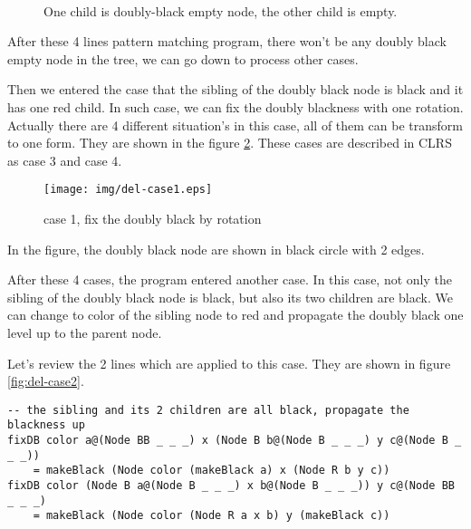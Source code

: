 \documentclass{article}
\begin{document}
\begin{figure}[htbp]
   \centering
    \\
   \caption{One child is doubly-black empty node, the other child is empty.} \label{fig:db-fix-1-nil}
\end{figure}


After these 4 lines pattern matching program, there won't be any doubly black empty
node in the tree, we can go down to process other cases.

Then we entered the case that the sibling of the doubly black node is black and it
has one red child. In such case, we can fix the doubly blackness with one rotation.
Actually there are 4 different situation's in this case, all of them can be transform
to one form. They are shown in the figure \ref{fig:del-case1}. These cases are described
in CLRS as case 3 and case 4.

\begin{figure}[htbp]
       \begin{center}
	\texttt{[image: img/del-case1.eps]}
        \caption{case 1, fix the doubly black by rotation} \label{fig:del-case1}
       \end{center}
\end{figure}

In the figure, the doubly black node are shown in black circle with 2 edges.

After these 4 cases, the program entered another case. In this case, not only the sibling
of the doubly black node is black, but also its two children are black. We can change to color
of the sibling node to red and propagate the doubly black one level up to the parent node.

Let's review the 2 lines which are applied to this case. They are shown in figure \ref{fig:del-case2}.

\begin{lstlisting}
-- the sibling and its 2 children are all black, propagate the blackness up
fixDB color a@(Node BB _ _ _) x (Node B b@(Node B _ _ _) y c@(Node B _ _ _))
    = makeBlack (Node color (makeBlack a) x (Node R b y c))
fixDB color (Node B a@(Node B _ _ _) x b@(Node B _ _ _)) y c@(Node BB _ _ _)
    = makeBlack (Node color (Node R a x b) y (makeBlack c))
\end{lstlisting}
\end{document}

